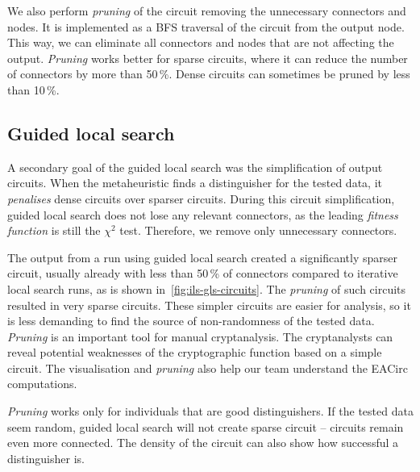 \documentclass[
    digital,    %
    oneside,    %
    color,
    11pt,
    nocover,
    notable,
    nolof,
    nolot,
]{fithesis3}
\begin{document}
We also perform \textit{pruning} of the circuit removing the unnecessary connectors and nodes. It is implemented as a BFS traversal of the circuit from the output node. This way, we can eliminate all connectors and nodes that are not affecting the output. \textit{Pruning} works better for sparse circuits, where it can reduce the number of connectors by more than 50\,\%. Dense circuits can sometimes be pruned by less than 10\,\%.

\subsection{Guided local search}
\label{subsec:res-circ-anal-gls}

A secondary goal of the guided local search was the simplification of output circuits. When the metaheuristic finds a distinguisher for the tested data, it \textit{penalises} dense circuits over sparser circuits. During this circuit simplification, guided local search does not lose any relevant connectors, as the leading \textit{fitness function} is still the $\chi^{2}$ test. Therefore, we remove only unnecessary connectors.

The output from a run using guided local search created a significantly sparser circuit, usually already with less than 50\,\% of connectors compared to iterative local search runs, as is shown in~\cref{fig:ils-gls-circuits}. The \textit{pruning} of such circuits resulted in very sparse circuits. These simpler circuits are easier for analysis, so it is less demanding to find the source of non-randomness of the tested data. \textit{Pruning} is an important tool for manual cryptanalysis. The cryptanalysts can reveal potential weaknesses of the cryptographic function based on a simple circuit. The visualisation and \textit{pruning} also help our team understand the EACirc computations.

\textit{Pruning} works only for individuals that are good distinguishers. If the tested data seem random, guided local search will not create sparse circuit -- circuits remain even more connected. The density of the circuit can also show how successful a distinguisher is.
\end{document}
